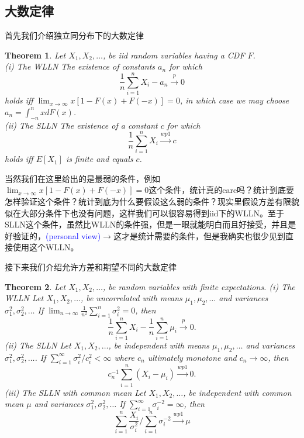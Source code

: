 \documentclass{article}
\newtheorem{theorem}{Theorem}[section]
\begin{document}
\subsection{大数定律}
\par 首先我们介绍独立同分布下的大数定律
\begin{theorem}
	Let $X_1, X_2, \ldots$, be iid random variables having a CDF $F$.\\
	(i) The WLLN The existence of constants $a_n$ for which
	$$
	\frac{1}{n} \sum_{i=1}^n X_i-a_n \stackrel{p}{\rightarrow} 0
	$$
	holds iff $\lim _{x \rightarrow \infty} x[1-F(x)+F(-x)]=0$, in which case we may choose $a_n=\int_{-n}^n x d F(x)$.\\
	(ii) The SLLN The existence of a constant $c$ for which
	$$
	\frac{1}{n} \sum_{i=1}^n X_i \stackrel{w p 1}{\rightarrow} c
	$$
	holds iff $E\left[X_1\right]$ is finite and equals $c$.
\end{theorem}
当然我们在这里给出的是最弱的条件，例如$\lim _{x \rightarrow \infty} x[1-F(x)+F(-x)]=0$这个条件，统计真的care吗？统计到底要怎样验证这个条件？统计到底为什么要假设这么弱的条件？现实里假设方差有限貌似在大部分条件下也没有问题，这样我们可以很容易得到iid下的WLLN。至于SLLN这个条件，虽然比WLLN的条件强，但是一眼就能明白而且好接受，并且是好验证的，\textcolor{blue}{(personal view)}$\to$这才是统计需要的条件，但是我确实也很少见到直接使用这个WLLN。
\par 接下来我们介绍允许方差和期望不同的大数定律
\begin{theorem}
	Let $X_1, X_2, \ldots$, be random variables with finite expectations.
	(i) The WLLN Let $X_1, X_2, \ldots$, be uncorrelated with means $\mu_1, \mu_2, \ldots$ and variances $\sigma_1^2, \sigma_2^2, \ldots$ If $\lim _{n \rightarrow \infty} \frac{1}{n^2} \sum_{i=1}^n \sigma_i^2=0$, then
	$$
	\frac{1}{n} \sum_{i=1}^n X_i-\frac{1}{n} \sum_{i=1}^n \mu_i \stackrel{p}{\rightarrow} 0 .
	$$
	(ii) The SLLN Let $X_1, X_2, \ldots$, be independent with means $\mu_1, \mu_2, \ldots$ and variances $\sigma_1^2, \sigma_2^2, \ldots$. If $\sum_{i=1}^{\infty} \sigma_i^2 / c_i^2<\infty$ where $c_n$ ultimately monotone and $c_n \rightarrow \infty$, then
	$$
	c_n^{-1} \sum_{i=1}^n\left(X_i-\mu_i\right) \stackrel{w p 1}{\rightarrow} 0 .
	$$
	(iii) The SLLN with common mean Let $X_1, X_2, \ldots$, be independent with common mean $\mu$ and variances $\sigma_1^2, \sigma_2^2, \ldots$ If $\sum_{i=1}^{\infty} \sigma_i^{-2}=\infty$, then
	$$
	\sum_{i=1}^n \frac{X_i}{\sigma_i^2} / \sum_{i=1}^n \sigma_i^{-2} \stackrel{w p 1}{\rightarrow} \mu
	$$
\end{theorem}
\end{document}
